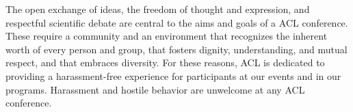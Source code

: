 \noindent The open exchange of ideas, the freedom of thought and expression, and respectful scientific debate are central to the aims and goals of a ACL conference.
These require a community and an environment that recognizes the inherent worth of every person and group, that fosters dignity, understanding, and mutual respect, and that embraces diversity.
For these reasons, ACL is dedicated to providing a harassment-free experience for participants at our events and in our programs.
Harassment and hostile behavior are unwelcome at any ACL conference.